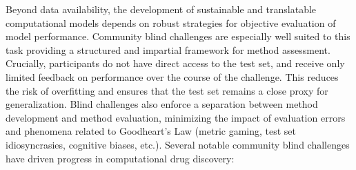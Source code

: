 \documentclass[journal=jcim,manuscript=article]{achemso}
\begin{document}
Beyond data availability, the development of sustainable and translatable computational models depends on robust strategies for objective evaluation of model performance\cite{wognum_call_2024, ash_practically_2024, kramer_need_2025}. Community blind challenges are especially well suited to this task providing a structured and impartial framework for method assessment. Crucially, participants do not have direct access to the test set, and receive only limited feedback on performance over the course of the challenge. This reduces the risk of overfitting and ensures that the test set remains a close proxy for generalization. Blind challenges also enforce a separation between method development and method evaluation, minimizing the impact of evaluation errors and phenomena related to Goodheart's Law (metric gaming, test set idiosyncrasies, cognitive biases, etc.)\cite{goodheart_types}. Several notable community blind challenges have driven progress in computational drug discovery: 
\end{document}
